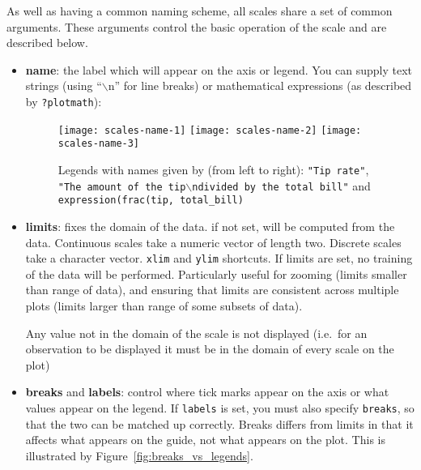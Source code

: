 As well as having a common naming scheme, all scales share a set of common arguments.  These arguments control the basic operation of the scale and are described below.

\begin{itemize}
  \item {\bf name}:  the label which will appear on the axis or legend. You can supply text strings (using ``$\backslash$n'' for line breaks) or mathematical expressions (as described by \verb|?plotmath|):
  
  \begin{figure}[htbp]
    \centering
      \texttt{[image: scales-name-1]}%
      \texttt{[image: scales-name-2]}%
      \texttt{[image: scales-name-3]}
    \caption{Legends with names given by (from left to right): {\tt "Tip rate"}, {\tt "The amount of the tip$\backslash$ndivided by the total bill"} and {\tt expression(frac(tip, total\_bill)} }
    \label{fig:label}
  \end{figure}
  

  \item {\bf limits}: fixes the domain of the data.  if not set, will be computed from the data.    Continuous scales take a numeric vector of length two.  Discrete scales take a character vector.  {\tt xlim} and {\tt ylim} shortcuts.  If limits are set, no training of the data will be performed.  Particularly useful for zooming (limits smaller than range of data), and ensuring that limits are consistent across multiple plots (limits larger than range of some subsets of data).  
  
  Any value not in the domain of the scale is not displayed (i.e.\ for an observation to be displayed it must be in the domain of every scale on the plot)

  \item {\bf breaks} and {\bf labels}: control where tick marks appear on the axis or what values appear on the legend.  If {\tt labels} is set, you must also specify {\tt breaks}, so that the two can be matched up correctly.  Breaks differs from limits in that it affects what appears on the guide, not what appears on the plot.  This is illustrated by Figure~\ref{fig:breaks_vs_legends}.
  
\end{itemize}

